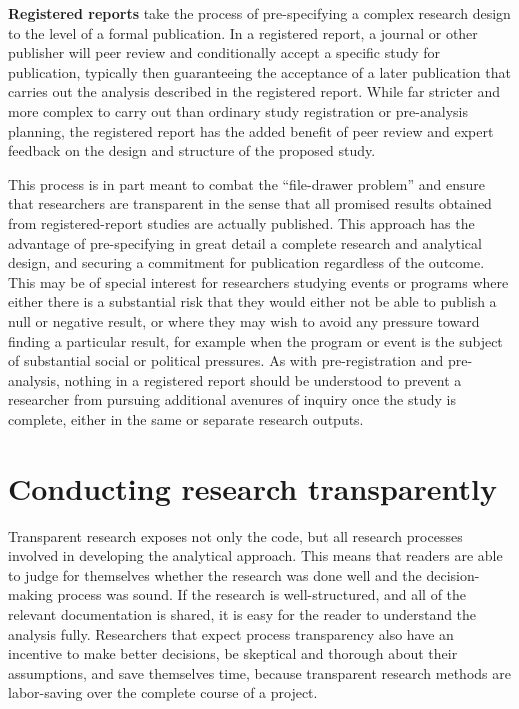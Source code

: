 \textbf{Registered reports}
take the process of pre-specifying a complex research design
to the level of a formal publication.
In a registered report, a journal or other publisher
will peer review and conditionally accept a specific study for publication,
typically then guaranteeing the acceptance of a later publication
that carries out the analysis described in the registered report.
While far stricter and more complex to carry out than
ordinary study registration or pre-analysis planning,
the registered report has the added benefit
of peer review and expert feedback
on the design and structure of the proposed study.

This process is in part meant to combat the ``file-drawer problem''
and ensure that researchers are transparent in the sense that
all promised results obtained from registered-report studies are actually published.
This approach has the advantage of pre-specifying in great detail
a complete research and analytical design,
and securing a commitment for publication regardless of the outcome.
This may be of special interest for researchers
studying events or programs where either there is a substantial risk
that they would either not be able to publish a null or negative result,
or where they may wish to avoid any pressure toward finding a particular result,
for example when the program or event is the subject of substantial social or political pressures.
As with pre-registration and pre-analysis,
nothing in a registered report should be understood
to prevent a researcher from pursuing additional avenures of inquiry
once the study is complete, either in the same or separate research outputs.

\section{Conducting research transparently}
Transparent research exposes not only the code,
but all research processes involved in developing the analytical approach.
This means that readers are able to judge for themselves whether the research was done well
and the decision-making process was sound.
If the research is well-structured, and all of the relevant documentation
is shared, it is easy for the reader to understand the analysis fully.
Researchers that expect process transparency also have an incentive to make better decisions,
be skeptical and thorough about their assumptions,
and save themselves time,
because transparent research methods are labor-saving over the complete course of a project.

